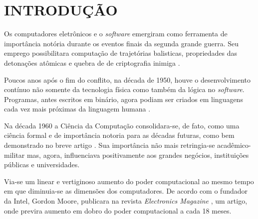 


\section{\textbf{INTRODUÇÃO}}
    \label{sec:introdução}



    Os computadores eletrônicos e o \textit{software} emergiram como ferramenta de importância
    notória durante os eventos finais da segunda grande guerra. Seu emprego possibilitara
    computação de trajetórias balisticas, propriedades das detonações atômicas e quebra de
    de criptografia inimiga \cite[~p.4]{dodig2001history}.
    
    Poucos anos após o fim do conflito, na década de 1950, houve o desenvolvimento contínuo
    não somente da tecnologia física como também da lógica no \textit{software}.
    Programas, antes escritos em binário, agora podiam ser criados em linguagens
    cada vez mais próximas da linguagem humana \cite[~p.5]{dodig2001history}.

    Na década 1960 a Ciência da Computação consolidara-se, de fato, como uma ciência formal
    e de importância notoria para as décadas futuras, como bem demonstrado no breve artigo 
    \cite{newell1967what}. Sua importância não mais retringia-se acadêmico-militar mas,
    agora, influenciava positivamente aos grandes negócios, instituições públicas e universidades.

    Via-se um linear e vertiginoso aumento do poder computacional ao mesmo tempo em
    que diminuia-se as dimensões dos computadores. De acordo com 
    o fundador da Intel, Gordon Moore, publicara na revista \textit{ Electronics Magazine }
    , um artigo, onde previra aumento em dobro do poder computacional a cada 18 meses.

